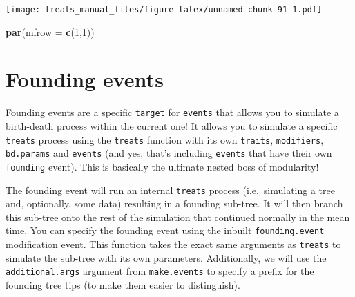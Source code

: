 \documentclass[
]{book}
\newenvironment{Shaded}{\begin{snugshade}}{\end{snugshade}}
\newcommand{\DataTypeTok}[1]{\textcolor[rgb]{0.13,0.29,0.53}{#1}}
\newcommand{\DecValTok}[1]{\textcolor[rgb]{0.00,0.00,0.81}{#1}}
\newcommand{\KeywordTok}[1]{\textcolor[rgb]{0.13,0.29,0.53}{\textbf{#1}}}
\newcommand{\NormalTok}[1]{#1}
\begin{document}
\texttt{[image: treats\_manual\_files/figure-latex/unnamed-chunk-91-1.pdf]}

\begin{Shaded}
\begin{Highlighting}[]
\KeywordTok{par}\NormalTok{(}\DataTypeTok{mfrow =} \KeywordTok{c}\NormalTok{(}\DecValTok{1}\NormalTok{,}\DecValTok{1}\NormalTok{))}
\end{Highlighting}
\end{Shaded}

\hypertarget{founding}{%
\section{Founding events}\label{founding}}

Founding events are a specific \texttt{target} for \texttt{events} that allows you to simulate a birth-death process within the current one!
It allows you to simulate a specific \texttt{treats} process using the \texttt{treats} function with its own \texttt{traits}, \texttt{modifiers}, \texttt{bd.params} and \texttt{events} (and yes, that's including \texttt{events} that have their own \texttt{founding} event).
This is basically the ultimate nested boss of modularity!

The founding event will run an internal \texttt{treats} process (i.e.~simulating a tree and, optionally, some data) resulting in a founding sub-tree.
It will then branch this sub-tree onto the rest of the simulation that continued normally in the mean time.
You can specify the founding event using the inbuilt \texttt{founding.event} modification event.
This function takes the exact same arguments as \texttt{treats} to simulate the sub-tree with its own parameters.
Additionally, we will use the \texttt{additional.args} argument from \texttt{make.events} to specify a prefix for the founding tree tips (to make them easier to distinguish).
\end{document}
